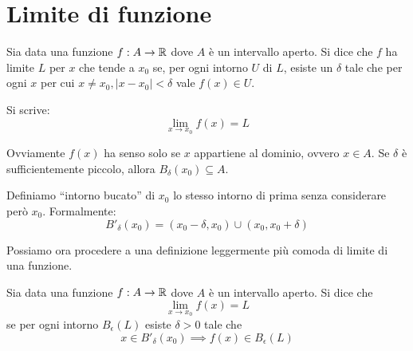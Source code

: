 \section{Limite di funzione}
\begin{definition}
Sia data una funzione $f: A \to \mathbb R$ dove $A$ è un intervallo aperto. Si dice che $f$ ha limite $L$ per $x$ che tende a $x_0$ se, per ogni intorno $U$ di $L$, esiste un $\delta$ tale che per ogni $x$ per cui $x \neq x_0, |x-x_0| < \delta$ vale $f(x) \in U$.
\end{definition}

Si scrive:
\begin{equation*}
\lim_{x \to x_0} f(x) = L
\end{equation*}

\begin{center}
\end{center}

Ovviamente $f(x)$ ha senso solo se $x$ appartiene al dominio, ovvero $x \in A$. Se $\delta$ è sufficientemente piccolo, allora $B_\delta (x_0) \subseteq A$.

Definiamo ``intorno bucato'' di $x_0$ lo stesso intorno di prima senza considerare però $x_0$. Formalmente:
\begin{equation*}
B'_\delta (x_0) = (x_0 - \delta, x_0) \cup (x_0, x_0 + \delta)
\end{equation*}

Possiamo ora procedere a una definizione leggermente più comoda di limite di una funzione.

\begin{definition}
Sia data una funzione $f: A \to \mathbb R$ dove $A$ è un intervallo aperto. Si dice che
\begin{equation*}
\lim_{x \to x_0} f(x) = L
\end{equation*}
se per ogni intorno $B_\epsilon (L)$ esiste $\delta > 0$ tale che
\begin{equation*}
x \in B'_\delta (x_0) \implies f(x) \in B_\epsilon (L)
\end{equation*}
\end{definition}

